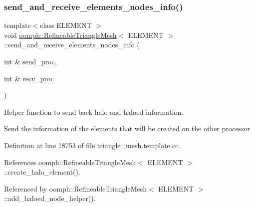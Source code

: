 \subsubsection{\texorpdfstring{send\+\_\+and\+\_\+receive\+\_\+elements\+\_\+nodes\+\_\+info()}{send\_and\_receive\_elements\_nodes\_info()}}
{\footnotesize\ttfamily template$<$class E\+L\+E\+M\+E\+NT $>$ \\
void \hyperlink{classoomph_1_1RefineableTriangleMesh}{oomph\+::\+Refineable\+Triangle\+Mesh}$<$ E\+L\+E\+M\+E\+NT $>$\+::send\+\_\+and\+\_\+receive\+\_\+elements\+\_\+nodes\+\_\+info (\begin{DoxyParamCaption}\item[{int \&}]{send\+\_\+proc,  }\item[{int \&}]{recv\+\_\+proc }\end{DoxyParamCaption})\hspace{0.3cm}{\ttfamily [protected]}}



Helper function to send back halo and haloed information. 

Send the information of the elements that will be created on the other processor 

Definition at line 18753 of file triangle\+\_\+mesh.\+template.\+cc.



References oomph\+::\+Refineable\+Triangle\+Mesh$<$ E\+L\+E\+M\+E\+N\+T $>$\+::create\+\_\+halo\+\_\+element().



Referenced by oomph\+::\+Refineable\+Triangle\+Mesh$<$ E\+L\+E\+M\+E\+N\+T $>$\+::add\+\_\+haloed\+\_\+node\+\_\+helper().

\mbox{\label{classoomph_1_1RefineableTriangleMesh_a995a2a4b90565b3d53e06fdc2ed24be1}} 
